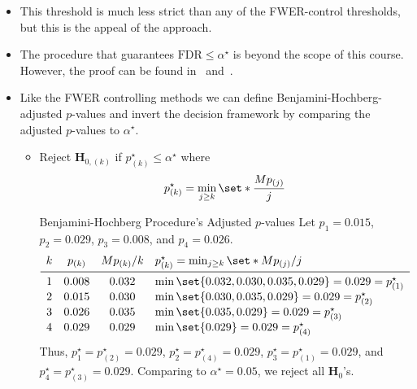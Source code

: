 \begin{itemize}
\begin{figure}[!htbp]
                  \caption{Significance Thresholds for Several Methods of Correction (2).}\label{fig:pvsrank2}
            \end{figure}
            \begin{Example}{Four-test Example --- Benjamini-Hochberg Procedure}{}
                  Let $ p_1=0.015 $, $ p_2=0.029 $, $ p_3=0.008 $, and $ p_4=0.026 $. Suppose that we wish to ensure
                  $ \FWER\le \alpha^\star=0.05 $. Since all $ p $-values fall below the purple line in~,
                  we reject all four null hypotheses.
            \end{Example}
      \item This threshold is much less strict than any of the FWER-control thresholds, but this is the appeal of
            the approach.
      \item The procedure that guarantees $ \text{FDR}\le \alpha^\star $ is beyond the scope of this course.
            However, the proof can be found in~\citet{benjamini} and~\citet{storey}.
      \item Like the FWER controlling methods we can define Benjamini-Hochberg-adjusted $p$-values and invert
            the decision framework by comparing the adjusted $ p $-values to $ \alpha^\star $.
            \begin{itemize}
                  \item Reject $ \mathbf{H}_{0,(k)} $ if $ p_{(k)}^\star\le \alpha^\star $ where
                        \[ p_{(k)}^\star=\min_{j\ge k}\set*{\frac{Mp_{(j)}}{j}} \]
                        \begin{Example}{Benjamini-Hochberg Procedure's Adjusted $ p $-values}{}
                              Let $ p_1=0.015 $, $ p_2=0.029 $, $ p_3=0.008 $, and $ p_4=0.026 $.
                              \[ \begin{array}{cccl}
                                          k & p_{(k)} & M p_{(k)}/k & p_{(k)}^\star=\min_{j\ge k}\set*{Mp_{(j)}/j}          \\
                                          \midrule
                                          1 & 0.008   & 0.032       & \min\set{0.032,0.030,0.035,0.029}=0.029=p_{(1)}^\star \\
                                          2 & 0.015   & 0.030       & \min\set{0.030,0.035,0.029}=0.029=p_{(2)}^\star       \\
                                          3 & 0.026   & 0.035       & \min\set{0.035,0.029}=0.029=p_{(3)}^\star             \\
                                          4 & 0.029   & 0.029       & \min\set{0.029}=0.029=p_{(4)}^\star
                                    \end{array} \]
                              Thus, $ p_1^\star=p_{(2)}^\star=0.029 $, $ p_2^\star=p_{(4)}^\star=0.029 $, $ p_3^\star=p_{(1)}^\star=0.029 $,
                              and $ p_4^\star=p_{(3)}^\star=0.029 $. Comparing to $ \alpha^\star=0.05 $,
                              we reject all $ \mathbf{H}_{0} $'s.
                        \end{Example}
            \end{itemize}
\end{itemize}
